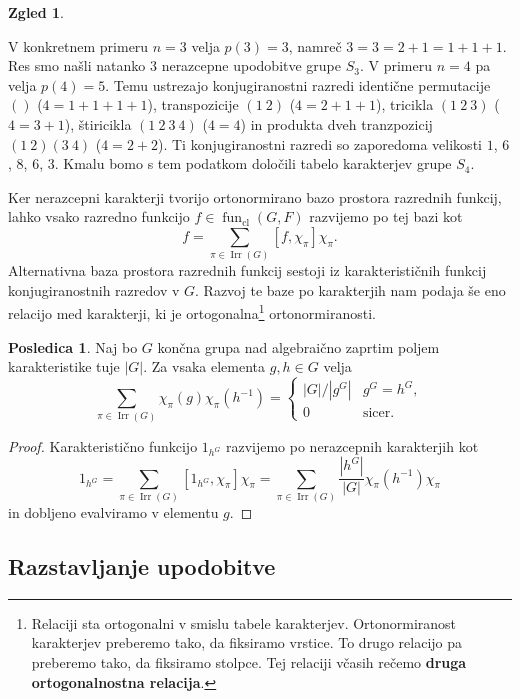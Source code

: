 \documentclass[11pt]{book}
\DeclareMathOperator\Irr{Irr}
\DeclareMathOperator\cl{cl}
\DeclareMathOperator\fun{fun}
\def\definicija{\color{rdeca}\bf}
\theoremstyle{definition}
\theoremstyle{zgled}
\newtheorem{zgled}[theorem]{Zgled}
\theoremstyle{zgledbrezstevilke}
\theoremstyle{odprtproblem}
\theoremstyle{domacanaloga}
\newenvironment{dokaz}
    {\color{siva}\begin{proof}}
    {\end{proof}}
\theoremstyle{izrek}
\newtheorem{posledica}[theorem]{Posledica}
\begin{document}
\begin{zgled}
\begin{itemize}
V konkretnem primeru $n = 3$ velja $p(3) = 3$, namreč $3 = 3 = 2 + 1 = 1 + 1 + 1$. Res smo našli natanko $3$ nerazcepne upodobitve grupe $S_3$. V primeru $n = 4$ pa velja $p(4) = 5$. Temu ustrezajo konjugiranostni razredi identične permutacije $()$ ($4 = 1 + 1 + 1 + 1$), transpozicije $(1 \ 2)$ ($4 = 2 + 1 + 1$), tricikla $(1 \ 2 \ 3)$ ($4 = 3 + 1$), štiricikla $(1 \ 2 \ 3 \ 4)$ ($4 = 4$) in produkta dveh tranzpozicij $(1 \ 2)(3 \ 4)$ ($4 = 2 + 2$). Ti konjugiranostni razredi so zaporedoma velikosti $1$, $6$, $8$, $6$, $3$. Kmalu bomo s tem podatkom določili tabelo karakterjev grupe $S_4$.
\end{itemize}
\end{zgled}

Ker nerazcepni karakterji tvorijo ortonormirano bazo prostora razrednih funkcij, lahko vsako razredno funkcijo $f \in \fun_{\cl}(G,F)$ razvijemo po tej bazi kot
\[
    f = \sum_{\pi \in \Irr(G)} [ f, \chi_{\pi} ] \chi_{\pi}.
\]
Alternativna baza prostora razrednih funkcij sestoji iz karakterističnih funkcij konjugiranostnih razredov v $G$. Razvoj te baze po karakterjih nam podaja še eno relacijo med karakterji, ki je ortogonalna\footnote{Relaciji sta ortogonalni v smislu tabele karakterjev. Ortonormiranost karakterjev preberemo tako, da fiksiramo vrstice. To drugo relacijo pa preberemo tako, da fiksiramo stolpce. Tej relaciji včasih rečemo {\definicija druga ortogonalnostna relacija}.} ortonormiranosti.

\begin{posledica}
Naj bo $G$ končna grupa nad algebraično zaprtim poljem karakteristike tuje $|G|$. Za vsaka elementa $g,h \in G$ velja
\[
    \sum_{\pi \in \Irr(G)} \chi_{\pi}(g) \chi_{\pi}(h^{-1}) = \begin{cases}
        |G|/|g^G| & g^G = h^G, \\
        0 & \text{sicer.}
    \end{cases}
\]
\end{posledica}
\begin{dokaz}
Karakteristično funkcijo $1_{h^G}$ razvijemo po nerazcepnih karakterjih kot
\[
    1_{h^G} = \sum_{\pi \in \Irr(G)} [ 1_{h^G}, \chi_{\pi} ] \chi_{\pi}
    = \sum_{\pi \in \Irr(G)} \frac{|h^G|}{|G|} \chi_{\pi}(h^{-1}) \chi_{\pi}
\]
in dobljeno evalviramo v elementu $g$.
\end{dokaz}

\subsection{Razstavljanje upodobitve}
\end{document}
